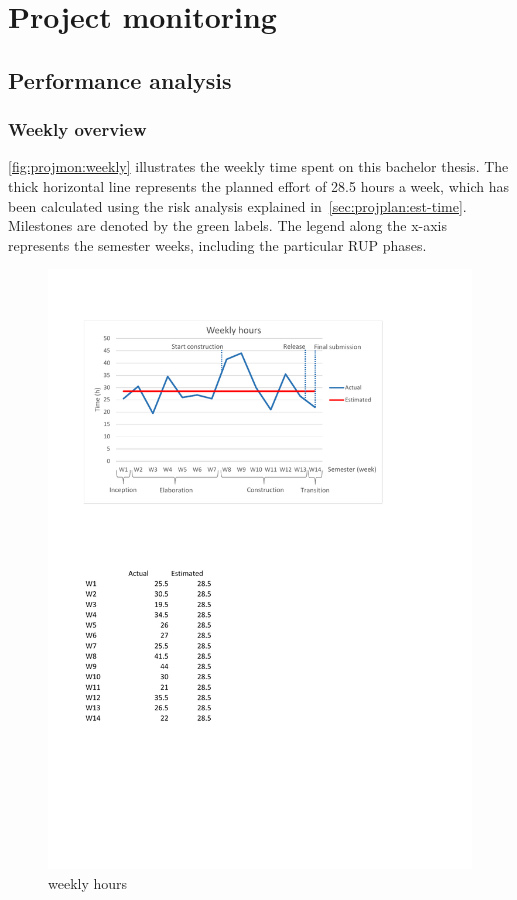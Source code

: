 \chapter{Project monitoring}
\section{Performance analysis}
\subsection{Weekly overview}

\autoref{fig:projmon:weekly} illustrates the weekly time spent on this bachelor
thesis. The thick horizontal line represents the planned effort of 28.5 hours a
week, which has been calculated using the risk analysis explained
in~\autoref{sec:projplan:est-time}.  Milestones are denoted by the green
labels. The legend along the x-axis represents the semester weeks, including
the particular RUP phases.


\begin{figure}[]
	\includegraphics[trim=2cm 18.3cm 4.6cm 2.8cm, clip=true, width=\textwidth]{img/project_monitoring_weekly_hours_diagram.pdf}
	\caption{weekly hours}
	\label{fig:weekly:hours}
\end{figure}

